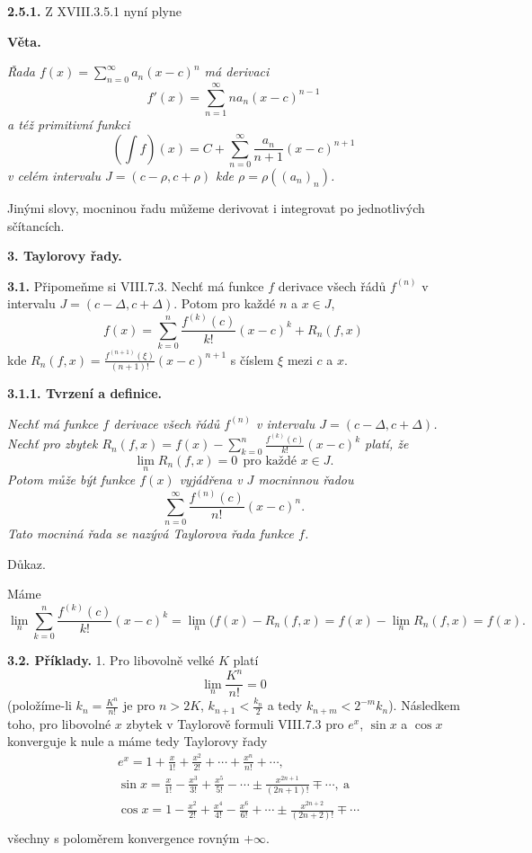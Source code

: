 \documentclass[12pt]{article}
\begin{document}
\bigskip

{\bf 2.5.1.} Z XVIII.3.5.1 nyní plyne
\smallskip

{\bf Věta.} {\em Řada $f(x)=\sum_{n=0}^\infty a_n(x-c)^n$ má derivaci
$$
f'(x)=\sum_{n=1}^\infty na_n(x-c)^{n-1}
$$
 a též primitivní funkci
$$
(\int f)(x)=C+\sum_{n=0}^\infty \frac{a_n}{n+1}(x-c)^{n+1}
$$
v celém intervalu $J=(c-\rho,c+\rho)$ kde $\rho=\rho((a_n)_n)$.

Jinými slovy, mocninou řadu můžeme derivovat i integrovat po jednotlivých sčítancích.}

 
   \vskip10mm
 
 {\large\bf 3. Taylorovy řady.}
 
 \bigskip

{\bf 3.1.} Připomeňme si VIII.7.3. Nechť má funkce $f$ derivace všech řádů $f^{(n)}$ v intervalu $J=(c-\Delta,c+\Delta)$. Potom pro každé $n$ a $x\in J$,
$$
 f(x)=\sum_{k=0}^n\frac{f^{(k)}(c)}{k!}(x-c)^k+R_n(f,x)
 $$ 
kde $R_n(f,x)=\frac{f^{(n+1)}(\xi)}{(n+1)!}(x-c)^{n+1}$ s číslem $\xi$ mezi $c$ a $x$.

\medskip

{\bf 3.1.1. Tvrzení a definice.} {\em Nechť má funkce $f$ derivace všech řádů $f^{(n)}$ v intervalu $J=(c-\Delta,c+\Delta)$.
Nechť pro zbytek $R_n(f,x)=f(x)-\sum_{k=0}^n\frac{f^{(k)}(c)}{k!}(x-c)^k$ platí, že
$$
\lim_n R_n(f,x)=0\ \ \text{pro každé $x\in J$}. 
$$
Potom může být funkce $f(x)$ vyjádřena v  $J$ mocninnou řadou
$$
\sum_{n=0}^\infty\frac{f^{(n)}(c)}{n!}(x-c)^n.
$$
Tato mocniná řada se nazývá {\em Taylorova řada} funkce $f$.


Důkaz.} Máme
$$
\lim_n\sum_{k=0}^n\frac{f^{(k)}(c)}{k!}(x-c)^k=\lim_n(f(x)-R_n(f,x)=
f(x)-\lim_nR_n(f,x)=f(x).
$$
\sq

\bigskip

{\bf 3.2. Příklady.} 1. Pro libovolně velké $K$ platí
$$
\lim_n\frac{K^n}{n!} =0
$$
(položíme-li $k_n=\frac{K^n}{n!}$ je pro $n>2K$, $k_{n+1}<\frac{k_n}{2}$ a tedy $k_{n+m}<2^{-m}k_n$). Následkem toho, pro libovolné  $x$ zbytek v  Taylorově formuli VIII.7.3 pro $e^x$, $\sin  x$ a $\cos x$ konverguje k nule a máme tedy  Taylorovy řady 
$$
\begin{aligned}
&e^x=1+\frac{x}{1!}+\frac{x^2}{2!}+ \cdots +\frac{x^n}{n!}+\cdots,\\
&\sin x= \frac{x}{1!}-\frac{x^3}{3!}+\frac{x^5}{5!}-\cdots\pm\frac{x^{2n+1}}{(2n+1)!}\mp\cdots, \ \text{a}\\
&\cos x= 1-\frac{x^2}{2!}+\frac{x^4}{4!}-\frac{x^6}{6!}+\cdots\pm\frac{x^{2n+2}}{(2n+2)!}\mp\cdots \\
\end{aligned}
$$
všechny s poloměrem konvergence rovným $+\infty$.
\end{document}
